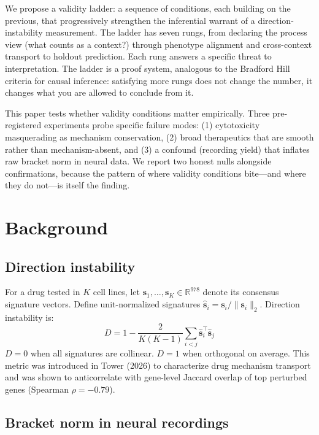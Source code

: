 \documentclass{article}
\begin{document}
We propose a validity ladder: a sequence of conditions, each building on the
previous, that progressively strengthen the inferential warrant of a
direction-instability measurement. The ladder has seven rungs, from declaring
the process view (what counts as a context?) through phenotype alignment and
cross-context transport to holdout prediction. Each rung answers a specific
threat to interpretation. The ladder is a proof system, analogous to the
Bradford Hill criteria for causal inference: satisfying more rungs does not
change the number, it changes what you are allowed to conclude from it.

This paper tests whether validity conditions matter empirically. Three
pre-registered experiments probe specific failure modes: (1) cytotoxicity
masquerading as mechanism conservation, (2) broad therapeutics that are
smooth rather than mechanism-absent, and (3) a confound (recording yield)
that inflates raw bracket norm in neural data. We report two honest nulls
alongside confirmations, because the pattern of where validity conditions
bite---and where they do not---is itself the finding.

\section{Background}

\subsection{Direction instability}

For a drug tested in $K$ cell lines, let $\mathbf{s}_1, \ldots,
\mathbf{s}_K \in \mathbb{R}^{978}$ denote its consensus signature vectors.
Define unit-normalized signatures $\hat{\mathbf{s}}_i = \mathbf{s}_i /
\|\mathbf{s}_i\|_2$. Direction instability is:
\begin{equation}
  D = 1 - \frac{2}{K(K-1)} \sum_{i < j}
    \hat{\mathbf{s}}_i^\top \hat{\mathbf{s}}_j
  \label{eq:direction_instability}
\end{equation}
$D = 0$ when all signatures are collinear. $D = 1$ when orthogonal on average.
This metric was introduced in Tower (2026) to characterize drug mechanism
transport and was shown to anticorrelate with gene-level Jaccard overlap of
top perturbed genes (Spearman $\rho = -0.79$).

\subsection{Bracket norm in neural recordings}
\end{document}
